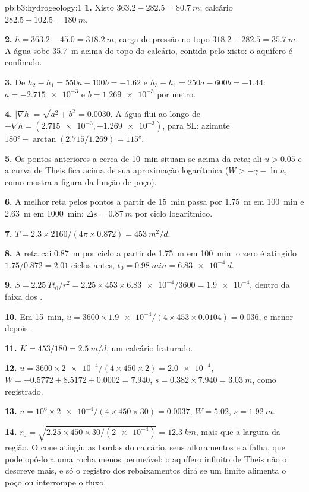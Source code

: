 \begin{solution}{pb:b3:hydrogeology:1}
\textbf{1.} Xisto $363.2 - 282.5 = \qty{80.7}{m}$; calcário $282.5 -
102.5 = \qty{180}{m}$.

\textbf{2.} $h = 363.2 - 45.0 = \qty{318.2}{m}$; carga de pressão no topo
$318.2 - 282.5 = \qty{35.7}{m}$. A água sobe \qty{35.7}{m} acima do
topo do calcário, contida pelo xisto: o aquífero é confinado.

\textbf{3.} De $h_2 - h_1 = 550a - 100b = -1.62$ e $h_3 - h_1 = 250a
- 600b = -1.44$: $a = \num{-2.715e-3}$ e $b = \num{1.269e-3}$ por
metro.

\textbf{4.} $|\nabla h| = \sqrt{a^2 + b^2} = \num{0.0030}$. A água
flui ao longo de $-\nabla h = (\num{2.715e-3}, \num{-1.269e-3})$, para
SL: azimute $\ang{180} - \arctan(2.715/1.269) = \ang{115}$.

\textbf{5.} Os pontos anteriores a cerca de \qty{10}{min} situam-se acima
da reta: ali $u > 0.05$ e a curva de Theis fica acima de sua aproximação
logarítmica ($W > -\gamma - \ln u$, como mostra a figura da função de poço).

\textbf{6.} A melhor reta pelos pontos a partir de \qty{15}{min} passa por
\qty{1.75}{m} em \qty{100}{min} e \qty{2.63}{m} em \qty{1000}{min}:
$\Delta s = \qty{0.87}{m}$ por ciclo logarítmico.

\textbf{7.} $T = 2.3\times2160/(4\pi\times0.872) = \qty{453}{m^2/d}$.

\textbf{8.} A reta cai \qty{0.87}{m} por ciclo a partir de \qty{1.75}{m}
em \qty{100}{min}: o zero é atingido $1.75/0.872 = 2.01$ ciclos antes,
$t_0 = \qty{0.98}{min} = \qty{6.83e-4}{d}$.

\textbf{9.} $S = 2.25\,Tt_0/r^2 = 2.25\times453\times\num{6.83e-4}/3600 =
\num{1.9e-4}$, dentro da faixa dos .

\textbf{10.} Em \qty{15}{min}, $u = 3600\times\num{1.9e-4}/(4\times453
\times0.0104) = \num{0.036}$, e menor depois.

\textbf{11.} $K = 453/180 = \qty{2.5}{m/d}$, um calcário fraturado.

\textbf{12.} $u = 3600\times\num{2e-4}/(4\times450\times2) =
\num{2.0e-4}$, $W = -0.5772 + 8.5172 + 0.0002 = \num{7.940}$, $s =
0.382\times7.940 = \qty{3.03}{m}$, como registrado.

\textbf{13.} $u = 10^6\times\num{2e-4}/(4\times450\times30) =
\num{0.0037}$, $W = \num{5.02}$, $s = \qty{1.92}{m}$.

\textbf{14.} $r_0 = \sqrt{2.25\times450\times30/(\num{2e-4})} =
\qty{12.3}{km}$, mais que a largura da região. O cone atingiu as bordas
do calcário, seus afloramentos e a falha, que pode opô-lo a uma rocha
menos permeável: o aquífero infinito de Theis não o descreve mais, e
só o registro dos rebaixamentos dirá se um limite alimenta o poço ou
interrompe o fluxo.


\end{solution}
